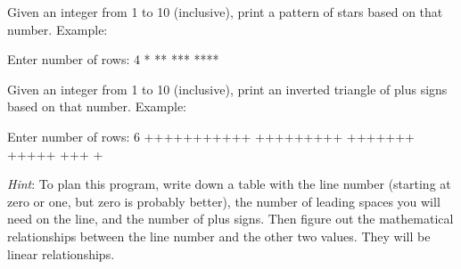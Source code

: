 \begin{exercise}
Given an integer from 1 to 10 (inclusive), print a pattern of stars based on that number. Example:

\begin{stdout}
Enter number of rows: 4
*
**
***
****
\end{stdout}
\end{exercise}

\begin{exercise}
Given an integer from 1 to 10 (inclusive), print an inverted triangle of plus signs based on that number. Example:

\begin{stdout}
Enter number of rows: 6
+++++++++++
 +++++++++
  +++++++
   +++++
    +++
     +
\end{stdout}

{\em Hint}: To plan this program, write down a table with the line number (starting at zero or one, but zero is probably better), the number of leading spaces you will need on the line, and the number of plus signs. Then figure out the mathematical relationships between the line number and the other two values. They will be linear relationships.
\end{exercise}
